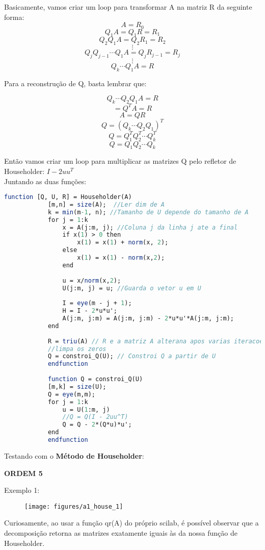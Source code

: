 \documentclass[leqno]{article}
\numberwithin{equation}{section}
\begin{document}
	Basicamente, vamos criar um loop para transformar A na matriz R da seguinte forma: \\
	$$A = R_0$$
	$$Q_1 A = Q_1 R = R_1$$
	$$Q_2 Q_1 A = Q_2 R_1 = R_2$$
	$$\vdots$$
	$$Q_j Q_{j-1} \cdots Q_1 A = Q_j R_{j-1} = R_j$$
	$$\vdots$$
	$$Q_k \cdots Q_1 A = R$$
	
	Para a reconstrução de Q, basta lembrar que:
	
	$$Q_k \cdots Q_2 Q_1 A = R$$
	$$= Q^TA = R$$
	$$A = QR$$
	$$Q = (Q_k \cdots Q_2 Q_1)^T$$
	$$Q = Q_1^T Q_2^T \cdots Q_k^T$$
	$$Q = Q_1 Q_2 \cdots Q_k$$
	
	\noindent Então vamos criar um loop para multiplicar as matrizes Q pelo refletor de Householder: $I - 2uu^T$\\	
	Juntando as duas funções:
	
	\begin{sol}			
		\begin{lstlisting}[style=mystyle, language=Scilab]
			function [Q, U, R] = Householder(A)
			[m,n] = size(A);  //Ler dim de A
			k = min(m-1, n); //Tamanho de U depende do tamanho de A
			for j = 1:k
				x = A(j:m, j); //Coluna j da linha j ate a final
				if x(1) > 0 then
					x(1) = x(1) + norm(x, 2);
				else
					x(1) = x(1) - norm(x,2);
				end
			
				u = x/norm(x,2);
				U(j:m, j) = u; //Guarda o vetor u em U
			
				I = eye(m - j + 1);
				H = I - 2*u*u';
				A(j:m, j:m) = A(j:m, j:m) - 2*u*u'*A(j:m, j:m);
			end
			
			R = triu(A) // R e a matriz A alterana apos varias iteracoes
			//limpa os zeros
			Q = constroi_Q(U); // Constroi Q a partir de U
			endfunction
			
			function Q = constroi_Q(U) 
			[m,k] = size(U);
			Q = eye(m,m);
			for j = 1:k
				u = U(1:m, j)
				//Q = Q(I - 2uu^T)
				Q = Q - 2*(Q*u)*u'; 
			end
			endfunction
		\end{lstlisting}
	\end{sol}

	Testando com o \textbf{Método de Householder}:
	
	
	\textbf{{\large ORDEM 5}}
	
	Exemplo 1:
	
	\begin{figure}[H]
		\centering
		\texttt{[image: figures/a1\_house\_1]}		
	\end{figure}

	Curiosamente, ao usar a função qr(A) do próprio scilab, é possível observar que a decomposição retorna as matrizes exatamente iguais às da nossa função de Householder.
	
\end{document}
